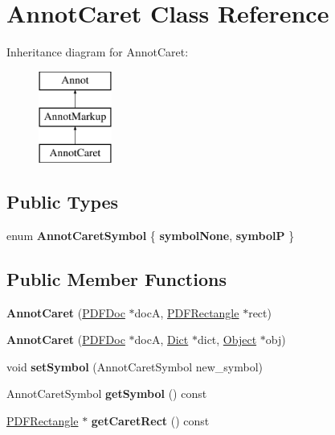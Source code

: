 \hypertarget{class_annot_caret}{}\section{Annot\+Caret Class Reference}
\label{class_annot_caret}
Inheritance diagram for Annot\+Caret\+:\begin{figure}[H]
\begin{center}
\leavevmode
\includegraphics[height=3.000000cm]{class_annot_caret}
\end{center}
\end{figure}
\subsection*{Public Types}
\begin{DoxyCompactItemize}
\item 
\mbox{\label{class_annot_caret_a7144af0e3ad23050ac03bdaecbb1aa57}} 
enum {\bfseries Annot\+Caret\+Symbol} \{ {\bfseries symbol\+None}, 
{\bfseries symbolP}
 \}
\end{DoxyCompactItemize}
\subsection*{Public Member Functions}
\begin{DoxyCompactItemize}
\item 
\mbox{\label{class_annot_caret_af220af82894ac13be031e0148be5889e}} 
{\bfseries Annot\+Caret} (\hyperlink{class_p_d_f_doc}{P\+D\+F\+Doc} $\ast$docA, \hyperlink{class_p_d_f_rectangle}{P\+D\+F\+Rectangle} $\ast$rect)
\item 
\mbox{\label{class_annot_caret_a85acf5fb8dcc0f57ea349c72ed085ca1}} 
{\bfseries Annot\+Caret} (\hyperlink{class_p_d_f_doc}{P\+D\+F\+Doc} $\ast$docA, \hyperlink{class_dict}{Dict} $\ast$dict, \hyperlink{class_object}{Object} $\ast$obj)
\item 
\mbox{\label{class_annot_caret_a06c1bf1e9d3828b262f25421c57ba80d}} 
void {\bfseries set\+Symbol} (Annot\+Caret\+Symbol new\+\_\+symbol)
\item 
\mbox{\label{class_annot_caret_a949bf542a3b16b7ac7512e05d24fdd4b}} 
Annot\+Caret\+Symbol {\bfseries get\+Symbol} () const
\item 
\mbox{\label{class_annot_caret_a95ce86ff8ee821b0dcb9a4b9ee9559e1}} 
\hyperlink{class_p_d_f_rectangle}{P\+D\+F\+Rectangle} $\ast$ {\bfseries get\+Caret\+Rect} () const
\end{DoxyCompactItemize}

